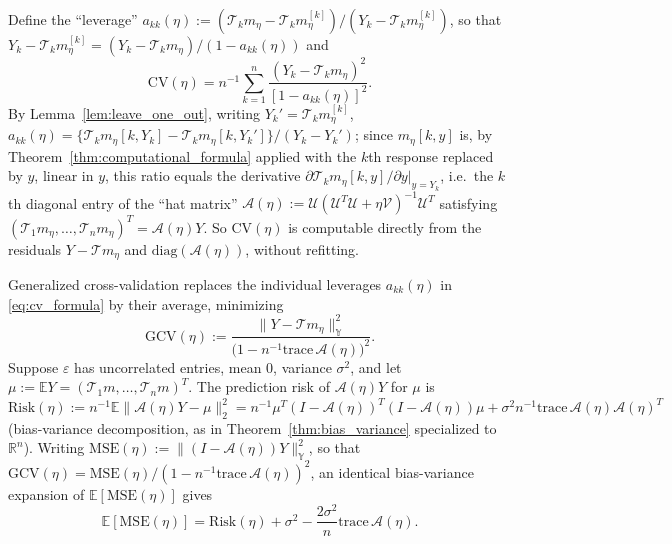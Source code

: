 Define the ``leverage'' $a_{kk}(\eta) := (\mathcal{T}_km_\eta-\mathcal{T}_k
m_\eta^{[k]})/(Y_k-\mathcal{T}_km_\eta^{[k]})$, so that $Y_k-\mathcal{T}_k
m_\eta^{[k]} = (Y_k-\mathcal{T}_km_\eta)/(1-a_{kk}(\eta))$ and
\begin{equation}
\mathrm{CV}(\eta) = n^{-1}\sum_{k=1}^n\frac{(Y_k-\mathcal{T}_km_\eta)^2}
{[1-a_{kk}(\eta)]^2}.
\label{eq:cv_formula}
\end{equation}
By Lemma~\ref{lem:leave_one_out}, writing $Y_k'=\mathcal{T}_km_\eta^{[k]}$,
$a_{kk}(\eta) = \{\mathcal{T}_km_\eta[k,Y_k]-\mathcal{T}_km_\eta[k,Y_k']\}/
(Y_k-Y_k')$; since $m_\eta[k,y]$ is, by
Theorem~\ref{thm:computational_formula} applied with the $k$th response
replaced by $y$, linear in $y$, this ratio equals the derivative
$\partial\mathcal{T}_km_\eta[k,y]/\partial y|_{y=Y_k}$, i.e.\ the $k$th
diagonal entry of the ``hat matrix'' $\mathcal{A}(\eta):=\mathcal{U}
(\mathcal{U}^T\mathcal{U}+\eta\mathcal{V})^{-1}\mathcal{U}^T$ satisfying
$(\mathcal{T}_1m_\eta,\dots,\mathcal{T}_nm_\eta)^T=\mathcal{A}(\eta)Y$. So
$\mathrm{CV}(\eta)$ is computable directly from the residuals $Y-
\mathcal{T}m_\eta$ and $\mathrm{diag}(\mathcal{A}(\eta))$, without
refitting.

Generalized cross-validation replaces the individual leverages $a_{kk}
(\eta)$ in \eqref{eq:cv_formula} by their average, minimizing
\begin{equation}
\mathrm{GCV}(\eta) := \frac{\|Y-\mathcal{T}m_\eta\|_{\mathbb{Y}}^2}{
\big(1-n^{-1}\mathrm{trace}\,\mathcal{A}(\eta)\big)^2}.
\label{eq:gcv_formula}
\end{equation}
Suppose $\varepsilon$ has uncorrelated entries, mean $0$, variance
$\sigma^2$, and let $\mu:=\mathbb{E}Y=(\mathcal{T}_1m,\dots,\mathcal{T}_nm)
^T$. The prediction risk of $\mathcal{A}(\eta)Y$ for $\mu$ is $\mathrm{Risk}
(\eta):=n^{-1}\mathbb{E}\|\mathcal{A}(\eta)Y-\mu\|_2^2 = n^{-1}\mu^T
(I-\mathcal{A}(\eta))^T(I-\mathcal{A}(\eta))\mu + \sigma^2n^{-1}
\mathrm{trace}\,\mathcal{A}(\eta)\mathcal{A}(\eta)^T$ (bias-variance
decomposition, as in Theorem~\ref{thm:bias_variance} specialized to
$\mathbb{R}^n$). Writing $\mathrm{MSE}(\eta):=\|(I-\mathcal{A}(\eta))Y\|_{
\mathbb{Y}}^2$, so that $\mathrm{GCV}(\eta)=\mathrm{MSE}(\eta)/(1-n^{-1}
\mathrm{trace}\,\mathcal{A}(\eta))^2$, an identical bias-variance expansion
of $\mathbb{E}[\mathrm{MSE}(\eta)]$ gives
\begin{equation}
\mathbb{E}[\mathrm{MSE}(\eta)] = \mathrm{Risk}(\eta) + \sigma^2 -
\frac{2\sigma^2}{n}\mathrm{trace}\,\mathcal{A}(\eta).
\label{eq:mse_risk_identity}
\end{equation}

